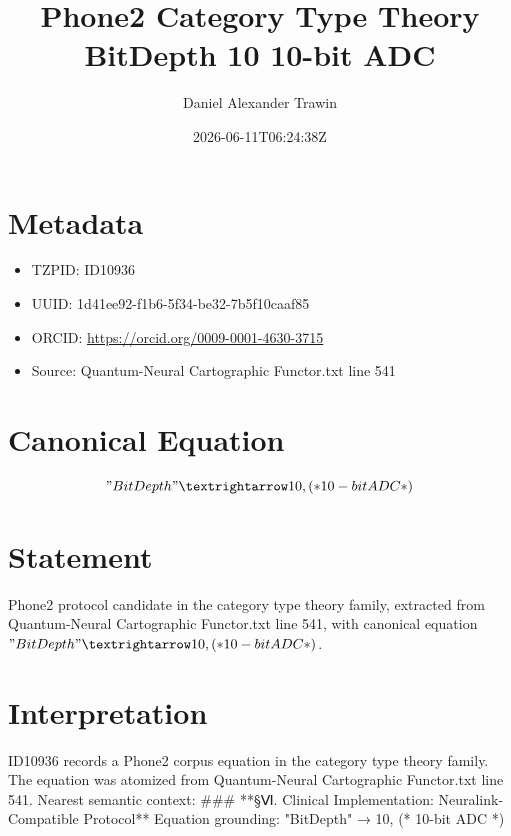 \documentclass[11pt]{article}
\title{Phone2 Category Type Theory BitDepth 10 10-bit ADC}
\author{Daniel Alexander Trawin}
\date{2026-06-11T06:24:38Z}
\begin{document}
\maketitle
\section*{Metadata}
\begin{itemize}
\item TZPID: ID10936
\item UUID: 1d41ee92-f1b6-5f34-be32-7b5f10caaf85
\item ORCID: \url{https://orcid.org/0009-0001-4630-3715}
\item Source: Quantum-Neural Cartographic Functor.txt line 541
\end{itemize}
\section*{Canonical Equation}
\[
"BitDepth" → 10, (* 10-bit ADC *)
\]
\section*{Statement}
Phone2 protocol candidate in the category type theory family, extracted from Quantum-Neural Cartographic Functor.txt line 541, with canonical equation $"BitDepth" → 10, (* 10-bit ADC *)$.
\section*{Interpretation}
ID10936 records a Phone2 corpus equation in the category type theory family. The equation was atomized from Quantum-Neural Cartographic Functor.txt line 541. Nearest semantic context: ### **§Ⅵ. Clinical Implementation: Neuralink-Compatible Protocol** Equation grounding: "BitDepth" → 10, (* 10-bit ADC *)
\end{document}
